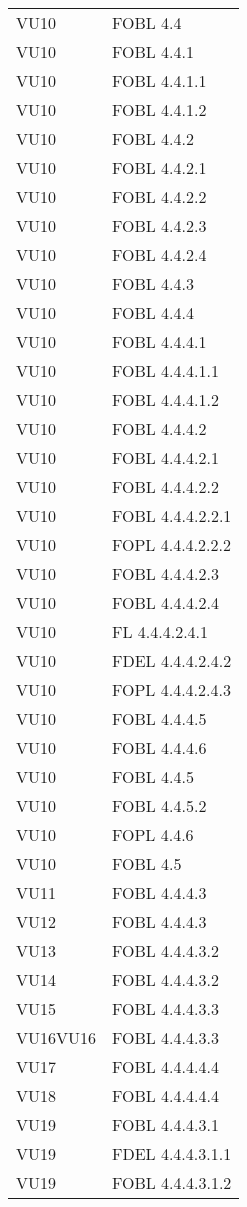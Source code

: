 \begin{longtable}{XX}
VU10&FOBL 4.4\\ 
VU10&FOBL 4.4.1\\ 
VU10&FOBL 4.4.1.1\\ 
VU10&FOBL 4.4.1.2\\ 
VU10&FOBL 4.4.2\\ 
VU10&FOBL 4.4.2.1\\ 
VU10&FOBL 4.4.2.2\\ 
VU10&FOBL 4.4.2.3\\ 
VU10&FOBL 4.4.2.4\\ 
VU10&FOBL 4.4.3\\ 
VU10&FOBL 4.4.4\\ 
VU10&FOBL 4.4.4.1\\ 
VU10&FOBL 4.4.4.1.1\\ 
VU10&FOBL 4.4.4.1.2\\ 
VU10&FOBL 4.4.4.2\\ 
VU10&FOBL 4.4.4.2.1\\ 
VU10&FOBL 4.4.4.2.2\\ 
VU10&FOBL 4.4.4.2.2.1\\ 
VU10&FOPL 4.4.4.2.2.2\\ 
VU10&FOBL 4.4.4.2.3\\ 
VU10&FOBL 4.4.4.2.4\\ 
VU10&FL 4.4.4.2.4.1\\ 
VU10&FDEL 4.4.4.2.4.2\\ 
VU10&FOPL 4.4.4.2.4.3\\ 
VU10&FOBL 4.4.4.5\\ 
VU10&FOBL 4.4.4.6\\ 
VU10&FOBL 4.4.5\\ 
VU10&FOBL 4.4.5.2\\ 
VU10&FOPL 4.4.6\\ 
VU10&FOBL 4.5\\ 
\midrule 
VU11&FOBL 4.4.4.3\\ 
\midrule 
VU12&FOBL 4.4.4.3\\ 
\midrule 
VU13&FOBL 4.4.4.3.2\\ 
\midrule 
VU14&FOBL 4.4.4.3.2\\ 
\midrule 
VU15&FOBL 4.4.4.3.3\\ 
\midrule 
VU16VU16&FOBL 4.4.4.3.3\\ 
\midrule 
VU17&FOBL 4.4.4.4.4\\ 
\midrule 
VU18&FOBL 4.4.4.4.4\\ 
\midrule 
VU19&FOBL 4.4.4.3.1\\ 
VU19&FDEL 4.4.4.3.1.1\\ 
VU19&FOBL 4.4.4.3.1.2\\ 

\end{longtable}
